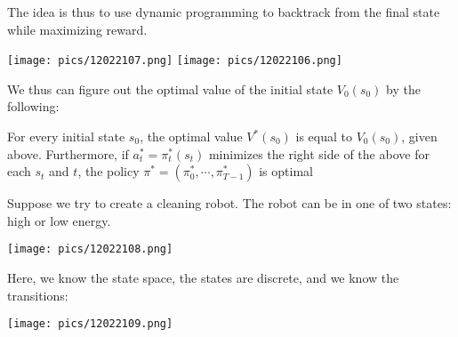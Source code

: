 \documentclass[11pt]{scrartcl}
\begin{document}
The idea is thus to use dynamic programming to backtrack from the final state while maximizing reward. 
\begin{center}
    \texttt{[image: pics/12022107.png]}
    \texttt{[image: pics/12022106.png]}
\end{center}
We thus can figure out the optimal value of the initial state $V_0(s_0)$ by the following:
\begin{thm}
For every initial state $s_0$, the optimal value $V^*(s_0)$ is equal to $V_0(s_0)$, given above. Furthermore, if $a^*_t = \pi^*_t(s_t)$ minimizes the right side of the above for each $s_t$ and $t$, the policy $\pi^*=(\pi^*_0,\cdots,\pi^*_{T-1})$ is optimal
\end{thm}

\begin{ex}
Suppose we try to create a cleaning robot. The robot can be in one of two states: high or low energy.
\begin{center}
    \texttt{[image: pics/12022108.png]}
\end{center}
Here, we know the state space, the states are discrete, and we know the transitions:
\begin{center}
    \texttt{[image: pics/12022109.png]}
\end{center}
\end{ex}
\end{document}
